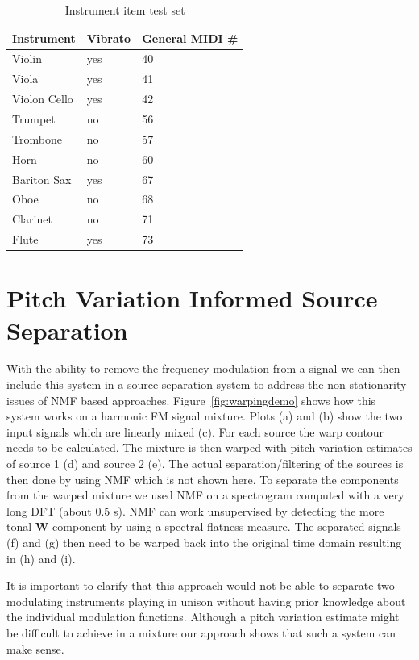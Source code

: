 \begin{table}
\begin{center}
\footnotesize
\begin{tabular}{ l l l}
  Instrument & Vibrato &  General MIDI \# \\
  \hline
  Violin & yes & 40 \\
  Viola & yes & 41 \\
  Violon Cello & yes & 42 \\
  Trumpet & no & 56 \\
  Trombone & no & 57\\
  Horn & no & 60  \\
  Bariton Sax & yes & 67 \\ %
  Oboe & no & 68\\
  Clarinet & no & 71\\
  Flute & yes & 73\\
\end{tabular}
\end{center}
\caption{Instrument item test set}
\label{tab:testset}
\end{table}

\section{Pitch Variation Informed Source Separation} %
\label{ssub:pitch_variation_informed_source_separation}

With the ability to remove the frequency modulation from a signal we can then include this system in a source separation system to address the non-stationarity issues of NMF based approaches. Figure~\ref{fig:warpingdemo} shows how this system works on a harmonic FM signal mixture. Plots (a) and (b) show the two input signals which are linearly mixed (c). For each source the warp contour needs to be calculated. The mixture is then warped with pitch variation estimates of source 1  (d) and source 2 (e). The actual separation/filtering of the sources is then done by using NMF which is not shown here. To separate the components from the warped mixture we used NMF on a spectrogram computed with a very long DFT (about 0.5 s). NMF can work unsupervised by detecting the more tonal $\textbf{W}$ component by using a spectral flatness measure. The separated signals (f) and (g) then need to be warped back into the original time domain resulting in (h) and (i).

It is important to clarify that this approach would not be
able to separate two modulating instruments playing in unison without having
prior knowledge about the individual modulation functions. Although a pitch variation estimate might be difficult to achieve in a mixture our approach shows that such a system can make sense.

